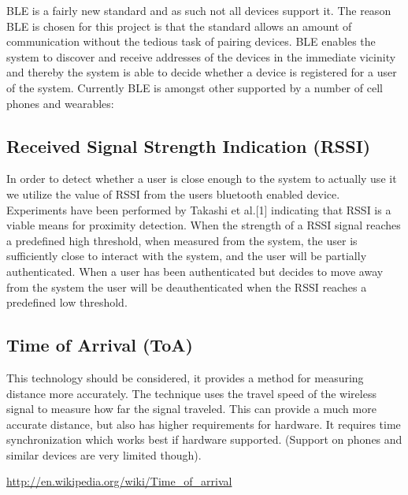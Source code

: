 BLE is a fairly new standard and as such not all devices support it.
The reason BLE is chosen for this project is that the standard allows an amount of communication without the tedious task of pairing devices.
BLE enables the system to discover and receive addresses of the devices in the immediate vicinity and thereby the system is able to decide whether a device is registered for a user of the system.
Currently BLE is amongst other supported by a number of cell phones and wearables:


\subsection{Received Signal Strength Indication (RSSI)}

In order to detect whether a user is close enough to the system to actually use it we utilize the value of RSSI from the users bluetooth enabled device.
Experiments have been performed by Takashi et al.[1] indicating that RSSI is a viable means for proximity detection.
When the strength of a RSSI signal reaches a predefined high threshold, when measured from the system, the user is sufficiently close to interact with the system, and the user will be partially authenticated.
When a user has been authenticated but decides to move away from the system the user will be deauthenticated when the RSSI reaches a predefined low threshold.

\subsection{Time of Arrival (ToA)} %
This technology should be considered, it provides a method for measuring distance more accurately.
The technique uses the travel speed of the wireless signal to measure how far the signal traveled.
This can provide a much more accurate distance, but also has higher requirements for hardware.
It requires time synchronization which works best if hardware supported. (Support on phones and similar devices are very limited though). %

\url{http://en.wikipedia.org/wiki/Time_of_arrival}

